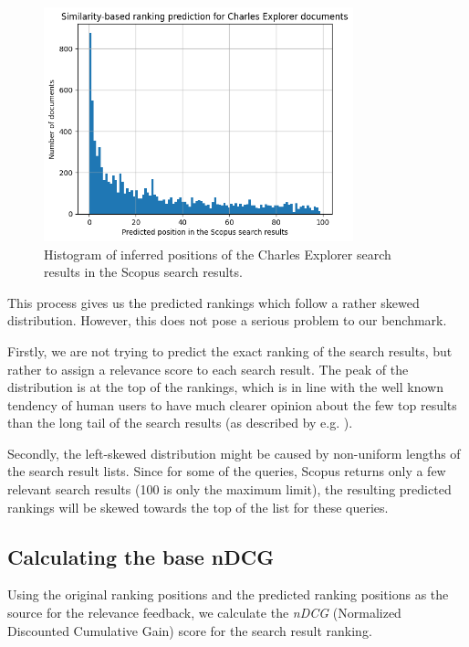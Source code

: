 \begin{figure}[ht!]
    \captionsetup{width=.9\linewidth}
    \includegraphics[width=0.8\textwidth]{../img/llm-embedding-positions-hist.png}
    \centering
    \caption{Histogram of inferred positions of the Charles Explorer search results in the Scopus search results.}
\end{figure}

This process gives us the predicted rankings which follow a rather skewed distribution. 
However, this does not pose a serious problem to our benchmark.

Firstly, we are not trying to predict the exact ranking of the search results, but rather to assign a relevance score to each search result. 
The peak of the distribution is at the top of the rankings, 
which is in line with the well known tendency of human users 
to have much clearer opinion about the few top results than the long tail of the search results (as described by e.g. \cite{9357332}).

Secondly, the left-skewed distribution might be caused by non-uniform lengths of the search result lists. 
Since for some of the queries, Scopus returns only a few relevant search results (100 is only the maximum limit), 
the resulting predicted rankings will be skewed towards the top of the list for these queries.

\subsection{Calculating the base nDCG}

Using the original ranking positions and the predicted ranking positions as the source for the 
relevance feedback, we calculate the \textit{nDCG} (Normalized Discounted Cumulative Gain) score for the 
search result ranking.

